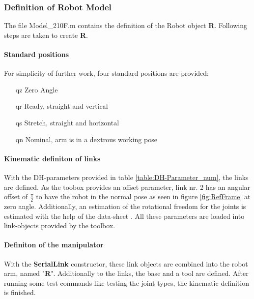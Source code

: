 \subsubsection{Definition of Robot Model}
The file Model_210F.m contains the definition of the Robot object \textbf{R}. Following steps are taken to create \textbf{R}.

\paragraph{Standard positions}
For simplicity of further work, four standard positions are provided:\\
\begin{itemize}
	\item[qz] Zero Angle
	\item[qr] Ready, straight and vertical
	\item[qs] Stretch, straight and horizontal
	\item[qn] Nominal, arm is in a dextrous working pose
\end{itemize}

\paragraph{Kinematic definiton of links}
With the DH-parameters provided in table \ref{table:DH-Parameter_num}, the links are defined. 
As the toobox provides an offset parameter, link nr. 2 has an angular offset of $\frac{\pi}{2}$ to have the robot in the normal pose as seen in figure \ref{fig:RefFrame} at zero angle.
Additionally, an estimation of the rotational freedom for the joints is estimated with the help of the data-sheet \cite{210FDatasheet}. All these parameters are loaded into link-objects provided by the toolbox.

\paragraph{Definiton of the manipulator }
With the \textbf{SerialLink} constructor, these link objects are combined into the robot arm, named "\textbf{R}". 
Additionally to the links, the base and a tool are defined. After running some test commands like testing the joint types, the kinematic definition is finished.


